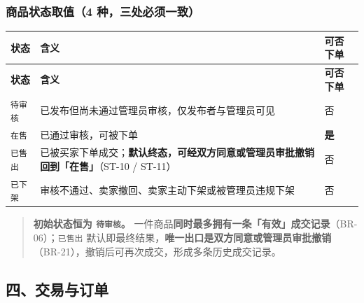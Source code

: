 \documentclass[12pt,a4paper]{ctexart}
\begin{document}
\subsubsection*{商品状态取值（4 种，三处必须一致）}

{\footnotesize
\begin{longtable}{|p{1.78cm}|p{12.02cm}|p{2.19cm}|}
\hline
\textbf{状态} & \textbf{含义} & \textbf{可否下单} \\
\hline
\endfirsthead
\hline
\textbf{状态} & \textbf{含义} & \textbf{可否下单} \\
\hline
\endhead
\hline
\endfoot
\texttt{待审核} & 已发布但尚未通过管理员审核，仅发布者与管理员可见 & 否 \\
\hline
\texttt{在售} & 已通过审核，可被下单 & \textbf{是} \\
\hline
\texttt{已售出} & 已被买家下单成交；\textbf{默认终态，可经双方同意或管理员审批撤销回到「在售」}（ST-10 / ST-11） & 否 \\
\hline
\texttt{已下架} & 审核不通过、卖家撤回、卖家主动下架或被管理员违规下架 & 否 \\
\hline
\end{longtable}
}


\begin{quote}\small
\textbf{初始状态恒为 \texttt{待审核}。} 一件商品\textbf{同时最多拥有一条「有效」成交记录}（BR-06）；\texttt{已售出} 默认即最终结果，\textbf{唯一出口是双方同意或管理员审批撤销}（BR-21），撤销后可再次成交，形成多条历史成交记录。

\end{quote}

\subsection*{四、交易与订单}
\end{document}
